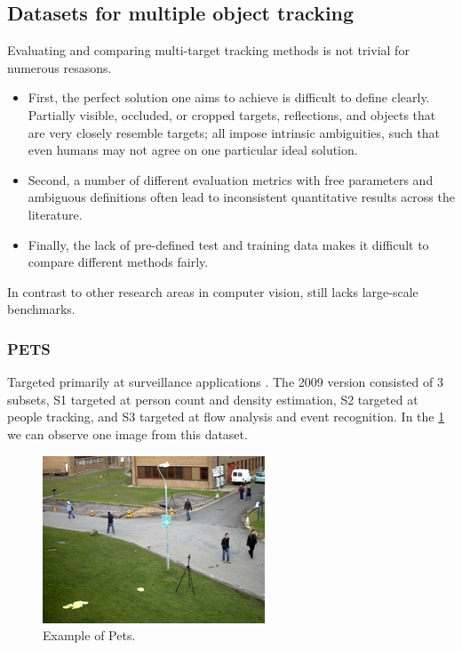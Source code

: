 \documentclass[12pt, a4paper, titlepage,twoside,openright]{article}
\begin{document}
\subsection{Datasets for multiple object tracking}

Evaluating and comparing multi-target tracking methods is not trivial for numerous resasons. 

\begin{itemize}

\item First, the perfect solution one aims to achieve is difficult to define clearly. Partially visible, occluded, or cropped targets, reflections, and objects that are very closely resemble targets; all impose intrinsic ambiguities, such that even humans may not agree on one particular ideal solution.

\item Second, a number of different evaluation metrics with free parameters and ambiguous definitions often lead to inconsistent quantitative results across the literature.

\item Finally, the lack of pre-defined test and training data makes it difficult to compare different methods fairly.

\end{itemize}


In contrast to other research areas in computer vision, still lacks large-scale benchmarks.

\subsubsection{PETS}

Targeted primarily at surveillance applications \cite{pets}. The 2009 version consisted of 3 subsets, S1 targeted at person count and density estimation, S2 targeted at people tracking, and S3 targeted at flow analysis and event recognition. In the \ref{petsExample} we can observe one image from this dataset.

\begin{figure}[H]
\centering         
\includegraphics[width=0.5\linewidth]{datasetTracking/View_001.jpg}
\caption{Example of Pets.} \label{petsExample}
\end{figure}
\end{document}
